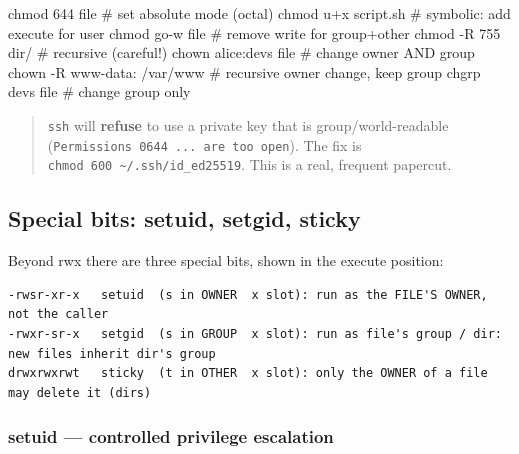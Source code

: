 \documentclass[11pt]{article}
\newenvironment{Shaded}{\begin{snugshade}}{\end{snugshade}}
\newcommand{\AttributeTok}[1]{\textcolor[rgb]{0.16,0.50,0.73}{#1}}
\newcommand{\CommentTok}[1]{\textcolor[rgb]{0.48,0.49,0.49}{#1}}
\newcommand{\FunctionTok}[1]{\textcolor[rgb]{0.56,0.27,0.68}{#1}}
\newcommand{\NormalTok}[1]{\textcolor[rgb]{0.81,0.81,0.76}{#1}}
\begin{document}

\begin{Shaded}
\begin{Highlighting}[]
\FunctionTok{chmod}\NormalTok{ 644 file              }\CommentTok{\# set absolute mode (octal)}
\FunctionTok{chmod}\NormalTok{ u+x script.sh         }\CommentTok{\# symbolic: add execute for user}
\FunctionTok{chmod}\NormalTok{ go{-}w file             }\CommentTok{\# remove write for group+other}
\FunctionTok{chmod} \AttributeTok{{-}R}\NormalTok{ 755 dir/           }\CommentTok{\# recursive (careful!)}
\FunctionTok{chown}\NormalTok{ alice:devs file       }\CommentTok{\# change owner AND group}
\FunctionTok{chown} \AttributeTok{{-}R}\NormalTok{ www{-}data: /var/www }\CommentTok{\# recursive owner change, keep group}
\FunctionTok{chgrp}\NormalTok{ devs file             }\CommentTok{\# change group only}
\end{Highlighting}
\end{Shaded}

\begin{quote}
\texttt{ssh} will \textbf{refuse} to use a private key that is group/world-readable (\texttt{Permissions\ 0644\ ...\ are\ too\ open}). The fix is \texttt{chmod\ 600\ \textasciitilde{}/.ssh/id\_ed25519}. This is a real, frequent papercut.
\end{quote}

\subsection{Special bits: setuid, setgid, sticky}\label{special-bits-setuid-setgid-sticky}

Beyond rwx there are three special bits, shown in the execute position:

\setcodelang{}

\begin{verbatim}
-rwsr-xr-x   setuid  (s in OWNER  x slot): run as the FILE'S OWNER, not the caller
-rwxr-sr-x   setgid  (s in GROUP  x slot): run as file's group / dir: new files inherit dir's group
drwxrwxrwt   sticky  (t in OTHER  x slot): only the OWNER of a file may delete it (dirs)
\end{verbatim}

\subsubsection{setuid --- controlled privilege escalation}\label{setuid--controlled-privilege-escalation}
\end{document}
